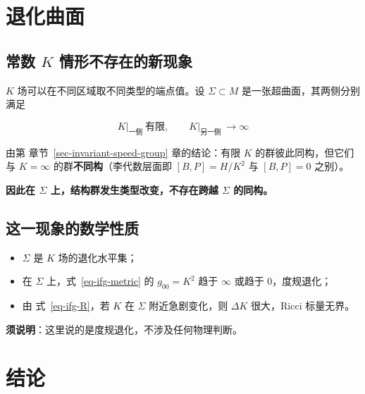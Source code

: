\documentclass[
  chinese,
  a4paper,
  UTF8,
  12pt,
  oneside,
  openany]{ctexbook}
\providecommand{\tightlist}{%
  \setlength{\itemsep}{0pt}\setlength{\parskip}{0pt}}
\theoremstyle{plain}
\theoremstyle{plain}
\theoremstyle{plain}
\theoremstyle{definition}
\theoremstyle{plain}
\theoremstyle{plain}
\theoremstyle{remark}
\begin{document}
\section{退化曲面}\label{sec-ifg-interface}

\subsection{\texorpdfstring{常数 \(K\)
情形不存在的新现象}{常数 K 情形不存在的新现象}}\label{ux5e38ux6570-k-ux60c5ux5f62ux4e0dux5b58ux5728ux7684ux65b0ux73b0ux8c61}

\(K\) 场可以在不同区域取不同类型的端点值。设 \(\Sigma\subset M\)
是一张超曲面，其两侧分别满足

\[
K\bigr|_{\text{一侧}}\ \text{有限},\qquad
K\bigr|_{\text{另一侧}}\ \to\infty
\]

由第 章节~\ref{sec-invariant-speed-group} 章的结论：有限 \(K\)
的群彼此同构，但它们与 \(K=\infty\) 的群\textbf{不同构}（李代数层面即
\([B,P]=H/K^{2}\) 与 \([B,P]=0\) 之别）。

\textbf{因此在 \(\Sigma\) 上，结构群发生类型改变，不存在跨越 \(\Sigma\)
的同构。}

\subsection{这一现象的数学性质}\label{ux8fd9ux4e00ux73b0ux8c61ux7684ux6570ux5b66ux6027ux8d28}

\begin{itemize}
\tightlist
\item
  \(\Sigma\) 是 \(K\) 场的退化水平集；
\item
  在 \(\Sigma\) 上，式~\ref{eq-ifg-metric} 的 \(g_{00}=K^{2}\) 趋于
  \(\infty\) 或趋于 \(0\)，度规退化；
\item
  由 式~\ref{eq-ifg-R}，若 \(K\) 在 \(\Sigma\) 附近急剧变化，则
  \(\Delta K\) 很大，Ricci 标量无界。
\end{itemize}

\textbf{须说明}：这里说的是度规退化，不涉及任何物理判断。

\section{结论}\label{sec-ifg-conclusion}
\end{document}
